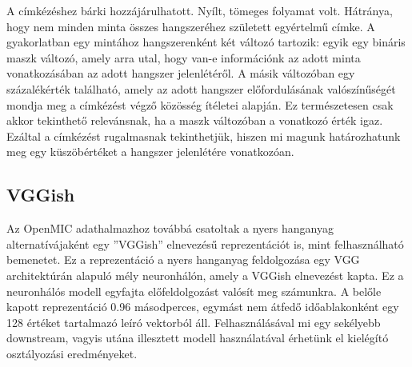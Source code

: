 A címkézéshez bárki hozzájárulhatott. Nyílt, tömeges folyamat volt. Hátránya, hogy nem minden minta összes hangszeréhez született egyértelmű címke. A gyakorlatban egy mintához hangszerenként két változó tartozik: egyik egy bináris maszk változó, amely arra utal, hogy van-e információnk az adott minta vonatkozásában az adott hangszer jelenlétéről. A másik változóban egy százalékérték található, amely az adott hangszer előfordulásának valószínűségét mondja meg a címkézést végző közösség ítéletei alapján. Ez természetesen csak akkor tekinthető relevánsnak, ha a maszk változóban a vonatkozó érték igaz. Ezáltal a címkézést rugalmasnak tekinthetjük, hiszen mi magunk határozhatunk meg egy küszöbértéket a hangszer jelenlétére vonatkozóan. \cite{humphrey2018openmic}

\subsection{VGGish}
\label{subsec:VGGish}

Az OpenMIC adathalmazhoz továbbá csatoltak a nyers hanganyag alternatívájaként egy ''VGGish'' elnevezésű reprezentációt is, mint felhasználható bemenetet. Ez a reprezentáció a nyers hanganyag feldolgozása egy VGG \cite{vgg} architektúrán alapuló mély neuronhálón, amely a VGGish elnevezést kapta. Ez a neuronhálós modell egyfajta előfeldolgozást valósít meg számunkra. A belőle kapott reprezentáció 0.96 másodperces, egymást nem átfedő időablakonként egy 128 értéket tartalmazó leíró vektorból áll. Felhasználásával mi egy sekélyebb downstream, vagyis utána illesztett modell használatával érhetünk el kielégító osztályozási eredményeket. \cite{vggish}